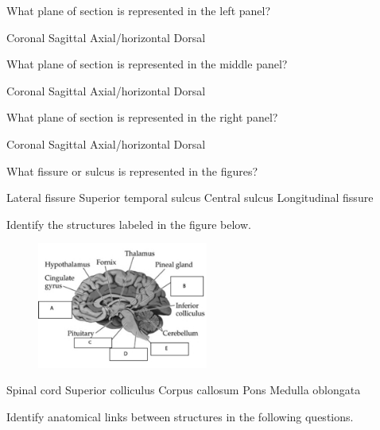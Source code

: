 \documentclass[answers]{exam}
\begin{document}
\begin{questions}

\question What plane of section is represented in the left panel?
\begin{choices}
\choice Coronal
\choice Sagittal
\correctchoice Axial/horizontal
\choice Dorsal
\end{choices}

\question What plane of section is represented in the middle panel?
\begin{choices}
\choice Coronal
\correctchoice Sagittal
\choice Axial/horizontal
\choice Dorsal
\end{choices}

\question What plane of section is represented in the right panel?
\begin{choices}
\correctchoice Coronal
\choice Sagittal
\choice Axial/horizontal
\choice Dorsal
\end{choices}

\question What fissure or sulcus is represented in the figures?
\begin{choices}
\correctchoice Lateral fissure
\choice Superior temporal sulcus
\choice Central sulcus
\choice Longitudinal fissure
\end{choices}

\newpage

\begin{center}
Identify the structures labeled in the figure below.
\end{center}

\begin{figure}[h]
\includegraphics[width=0.50\textwidth]{img/label-sagittal.jpg}
\centering
\end{figure}

\question Spinal cord
\question Superior colliculus
\question Corpus callosum
\question Pons
\question Medulla oblongata 

\begin{center}
Identify anatomical links between structures in the following questions.
\end{center}


\end{questions}
\end{document}
